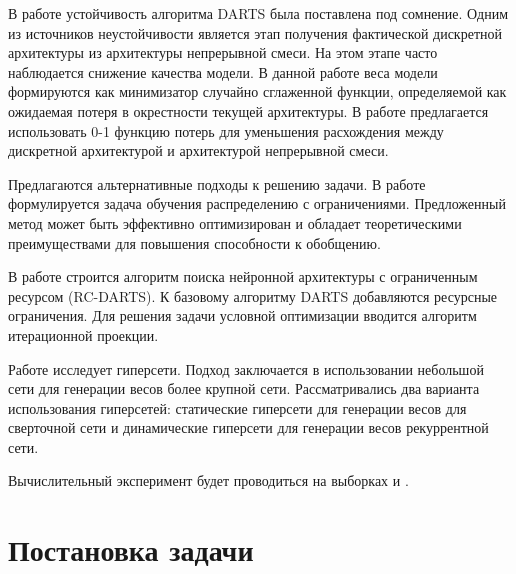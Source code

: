 \documentclass[12pt, twoside]{article}
\begin{document}
В работе \cite{journals/corr/abs-2002-05283} устойчивость алгоритма DARTS была поставлена под сомнение. Одним из источников неустойчивости является этап получения фактической дискретной архитектуры из архитектуры непрерывной смеси. На этом этапе часто наблюдается снижение качества модели. В данной работе веса модели формируются как минимизатор случайно сглаженной функции, определяемой как ожидаемая потеря в окрестности текущей архитектуры. В работе \cite{journals/corr/abs-1911-12126} предлагается использовать 0-1 функцию потерь для уменьшения расхождения между дискретной архитектурой и архитектурой непрерывной смеси.

Предлагаются альтернативные подходы к решению задачи. В работе \cite{journals/corr/abs-2006-10355} формулируется задача обучения распределению с ограничениями. Предложенный метод может быть эффективно оптимизирован и обладает теоретическими преимуществами для повышения способности к обобщению.

В работе \cite{journals/corr/abs-1912-12814} строится алгоритм поиска нейронной архитектуры с ограниченным ресурсом (RC-DARTS). К базовому алгоритму DARTS добавляются ресурсные ограничения. Для решения задачи условной оптимизации вводится алгоритм итерационной проекции.

Работе \cite{journals/corr/HaDL16} исследует гиперсети. Подход заключается в использовании небольшой сети для генерации весов более крупной сети. Рассматривались два варианта использования гиперсетей: статические гиперсети для генерации весов для сверточной сети и динамические гиперсети для генерации весов рекуррентной сети.

Вычислительный эксперимент будет проводиться на выборках \cite{lecun-mnisthandwrittendigit-2010} и \cite{cif}.

\newpage
\section{Постановка задачи}


\end{document}
